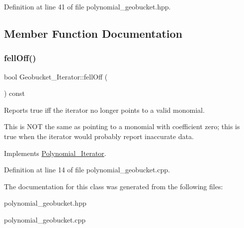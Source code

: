 Definition at line 41 of file polynomial\+\_\+geobucket.\+hpp.



\subsection{Member Function Documentation}
\mbox{\label{class_geobucket___iterator_a5845016f7b9cb2c7538cef310af0b102}} 
\subsubsection{\texorpdfstring{fell\+Off()}{fellOff()}}
{\footnotesize\ttfamily bool Geobucket\+\_\+\+Iterator\+::fell\+Off (\begin{DoxyParamCaption}{ }\end{DoxyParamCaption}) const\hspace{0.3cm}{\ttfamily [virtual]}}



Reports true iff the iterator no longer points to a valid monomial. 

This is N\+OT the same as pointing to a monomial with coefficient zero; this is true when the iterator would probably report inaccurate data. 

Implements \hyperlink{class_polynomial___iterator_ac571e120134088d6067718bbad513e2d}{Polynomial\+\_\+\+Iterator}.



Definition at line 14 of file polynomial\+\_\+geobucket.\+cpp.



The documentation for this class was generated from the following files\+:\begin{DoxyCompactItemize}
\item 
polynomial\+\_\+geobucket.\+hpp\item 
polynomial\+\_\+geobucket.\+cpp\end{DoxyCompactItemize}
